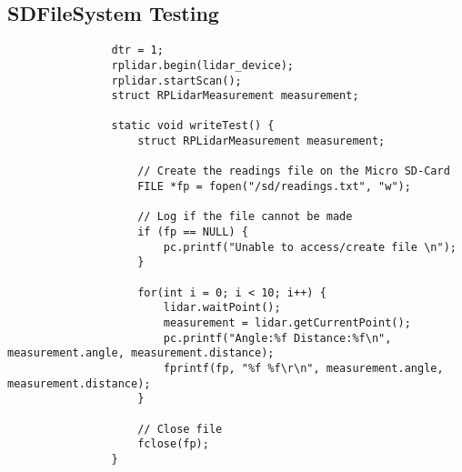 			\subsection{SDFileSystem Testing}
			\label{testcode:filewriting2}
			\begin{lstlisting}
				dtr = 1;
				rplidar.begin(lidar_device);
				rplidar.startScan();
				struct RPLidarMeasurement measurement;
				
				static void writeTest() {
					struct RPLidarMeasurement measurement;

					// Create the readings file on the Micro SD-Card
					FILE *fp = fopen("/sd/readings.txt", "w");
					
					// Log if the file cannot be made
					if (fp == NULL) {
						pc.printf("Unable to access/create file \n");
					}

					for(int i = 0; i < 10; i++) {
						lidar.waitPoint();
						measurement = lidar.getCurrentPoint();
						pc.printf("Angle:%f Distance:%f\n", measurement.angle, measurement.distance);
						fprintf(fp, "%f %f\r\n", measurement.angle, measurement.distance);
					}
					
					// Close file
					fclose(fp);
				}
			\end{lstlisting}
			
